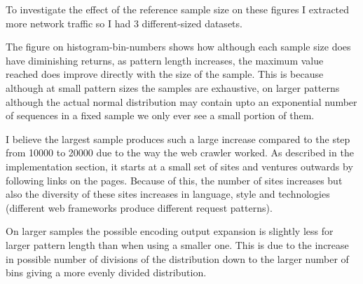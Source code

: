 \documentclass[10pt,a4paper]{article}
\begin{document}
\begin{figure}
\centering

\end{figure}

To investigate the effect of the reference sample size on these figures I extracted more network traffic so I had 3 different-sized datasets.

The figure on histogram-bin-numbers shows how although each sample size does have diminishing returns, as pattern length increases, the maximum value reached does improve directly with the size of the sample. This is because although at small pattern sizes the samples are exhaustive, on larger patterns although the actual normal distribution may contain upto an exponential number of sequences in a fixed sample we only ever see a small portion of them. 

I believe the largest sample produces such a large increase compared to the step from 10000 to 20000 due to the way the web crawler worked.
As described in the implementation section, it starts at a small set of sites and ventures outwards by following links on the pages.
Because of this, the number of sites increases but also the diversity of these sites increases in language, style and technologies (different web frameworks produce different request patterns).

On larger samples the possible encoding output expansion is slightly less for larger pattern length than when using a smaller one. This is due to the increase in possible number of divisions of the distribution down to the larger number of bins giving a more evenly divided distribution.
\end{document}
